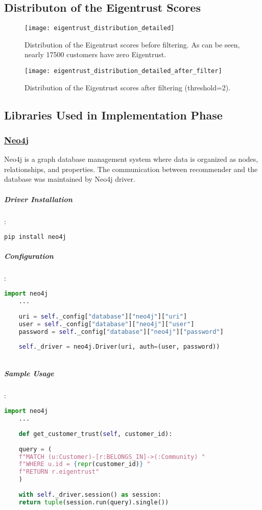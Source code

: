 \subsection{Distributon of the Eigentrust Scores}
\label{eigentrust_distribution_section}
\begin{figure}[H]
	\centering
	\texttt{[image: eigentrust\_distribution\_detailed]}
	\caption{Distribution of the Eigentrust scores before filtering. As can be seen, nearly 17500 customers have zero Eigentrust.}
	\label{fig:eigentrust_distribution_figure}
\end{figure}
\begin{figure}[H]
	\centering
	\texttt{[image: eigentrust\_distribution\_detailed\_after\_filter]}
	\caption{Distribution of the Eigentrust scores after filtering (threshold=2).}
	\label{fig:eigentrust_distribution_figure_after_filtering}
\end{figure}
\subsection{Libraries Used in Implementation Phase}
\subsubsection{\href{https://neo4j.com/}{Neo4j}}
Neo4j is a graph database management system where data is organized as nodes, relationships, and properties. The communication between recommender and the database was maintained by Neo4j driver.
\subparagraph{Driver Installation}:
\begin{lstlisting}[language=bash]
	pip install neo4j
\end{lstlisting}

\subparagraph{Configuration}:
\begin{lstlisting}[language=python]
	import neo4j
	...
	
	uri = self._config["database"]["neo4j"]["uri"]
	user = self._config["database"]["neo4j"]["user"]
	password = self._config["database"]["neo4j"]["password"]
	
	self._driver = neo4j.Driver(uri, auth=(user, password))
	
\end{lstlisting}

\subparagraph{Sample Usage}:
\begin{lstlisting}[language=python, caption=Neo4j driver example]
	import neo4j
	...
	
	def get_customer_trust(self, customer_id):
	
	query = (
	f"MATCH (u:Customer)-[r:BELONGS_IN]->(:Community) "
	f"WHERE u.id = {repr(customer_id)} "
	f"RETURN r.eigentrust"
	)
	
	with self._driver.session() as session:
	return tuple(session.run(query).single())
	
\end{lstlisting}

